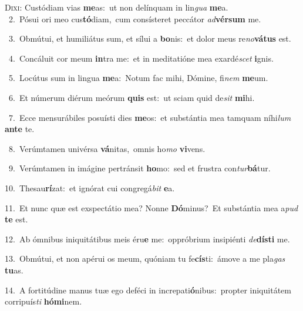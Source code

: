 \lettrine{\initial\textcolor{\initialcolor}{D}}{ixi:} Custódiam vias \textbf{me}\-as:~\star ut non delínquam in lin\textit{gua} \textbf{me}\-a.\\
{\numbfont\textcolor{\numbcolor}{~2.}}~Pósui ori meo cus\-\textbf{tó}\-diam,~\star cum consísteret peccátor \textit{ad}\-\textbf{vér}\textbf{sum} me.\par
{\numbfont\textcolor{\numbcolor}{~3.}}~Obmútui, et humiliátus sum, et sílui a \textbf{bo}\-nis:~\star et dolor meus re\-\textit{no}\-\textbf{vá}\textbf{tus} est.\par
{\numbfont\textcolor{\numbcolor}{~4.}}~Concáluit cor meum \textbf{in}\-tra me:~\star et in meditatióne mea exardé\textit{scet} \textbf{i}\-gnis.\par
{\numbfont\textcolor{\numbcolor}{~5.}}~Locútus sum in lingua \textbf{me}\-a:~\star Notum fac mihi, Dómine, fi\textit{nem} \textbf{me}\-um.\par
{\numbfont\textcolor{\numbcolor}{~6.}}~Et númerum diérum meórum \textbf{quis} est:~\star ut sciam quid de\textit{sit} \textbf{mi}\-hi.\par
{\numbfont\textcolor{\numbcolor}{~7.}}~Ecce mensurábiles posuísti dies \textbf{me}\-os:~\star et substántia mea tamquam níhi\textit{lum} \textbf{an}\-\textbf{te} te.\par
{\numbfont\textcolor{\numbcolor}{~8.}}~Verúmtamen univérsa \textbf{vá}\-nitas,~\star omnis ho\textit{mo} \textbf{vi}\-vens.\par
{\numbfont\textcolor{\numbcolor}{~9.}}~Verúmtamen in imágine pertránsit \textbf{ho}\-mo:~\star sed et frustra con\-\textit{tur}\-\textbf{bá}tur.\par
{\numbfont\textcolor{\numbcolor}{10.}}~Thesau\-\textbf{rí}\-zat:~\star et ignórat cui congregá\textit{bit} \textbf{e}\-a.\par
{\numbfont\textcolor{\numbcolor}{11.}}~Et nunc quæ est exspectátio mea? Nonne \textbf{Dó}\-minus?~\star Et substántia mea a\textit{pud} \textbf{te} est.\par
{\numbfont\textcolor{\numbcolor}{12.}}~Ab ómnibus iniquitátibus meis éru\textbf{e} me:~\star oppróbrium insipiénti \textit{de}\-\textbf{dís}\textbf{ti} me.\par
{\numbfont\textcolor{\numbcolor}{13.}}~Obmútui, et non apérui os meum, quóniam tu fe\-\textbf{cís}\-ti:~\star ámove a me pla\textit{gas} \textbf{tu}\-as.\par
{\numbfont\textcolor{\numbcolor}{14.}}~A fortitúdine manus tuæ ego deféci in increpati\-\textbf{ó}\-nibus:~\star propter iniquitátem corripuís\textit{ti} \textbf{hó}\-\textbf{mi}nem.\par
